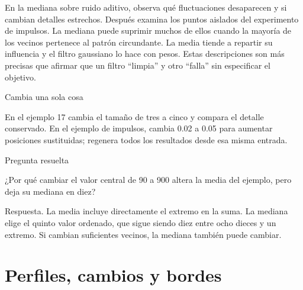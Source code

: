 


En la mediana sobre ruido aditivo, observa qué fluctuaciones desaparecen y si cambian detalles estrechos. Después examina los puntos aislados del experimento de impulsos. La mediana puede suprimir muchos de ellos cuando la mayoría de los vecinos pertenece al patrón circundante. La media tiende a repartir su influencia y el filtro gaussiano lo hace con pesos. Estas descripciones son más precisas que afirmar que un filtro “limpia” y otro “falla” sin especificar el objetivo.



\begin{Practica}{Cambia una sola cosa}

En el ejemplo 17 cambia el tamaño de tres a cinco y compara el detalle conservado. En el ejemplo de impulsos, cambia 0.02 a 0.05 para aumentar posiciones sustituidas; regenera todos los resultados desde esa misma entrada.


\end{Practica}


\begin{Idea}{Pregunta resuelta}

¿Por qué cambiar el valor central de 90 a 900 altera la media del ejemplo, pero deja su mediana en diez?


Respuesta. La media incluye directamente el extremo en la suma. La mediana elige el quinto valor ordenado, que sigue siendo diez entre ocho dieces y un extremo. Si cambian suficientes vecinos, la mediana también puede cambiar.


\end{Idea}

\chapter[Bordes]{Perfiles, cambios y bordes}

\label{cap:bordes}


